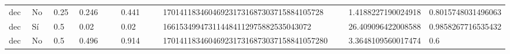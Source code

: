 {{\begin{longtable}{M{0.09\linewidth}M{0.09\linewidth}M{0.09\linewidth}M{0.09\linewidth}M{0.09\linewidth}M{0.09\linewidth}M{0.09\linewidth}M{0.09\linewidth}M{0.09\linewidth}M{0.09\linewidth}M{0.09\linewidth}}
dec & No & \num{0.25} & \num{0.246} &   & \num{0.441} &   & \num{170141183460469231731687303715884105728} &   & \num{1.4188227190024918} & \num{0.8015748031496063} \\
dec & Sí & \num{0.5} & \num{0.02} &   & \num{0.02} &   & \num{166153499473114484112975882535043072} &   & \num{26.409096422008588} & \num{0.9858267716535432} \\
dec & No & \num{0.5} & \num{0.496} &   & \num{0.914} &   & \num{1701411834604692317316873037158841057280} &   & \num{3.3648109560017474} & \num{0.6} \\

  \end{longtable}
  }
}
